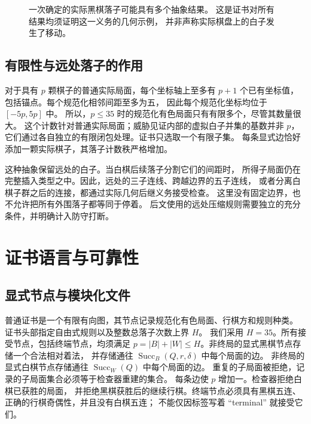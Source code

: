 \documentclass[11pt]{article}
\theoremstyle{definition}
\theoremstyle{remark}
\newcommand{\Succ}{\operatorname{Succ}}
\begin{document}
\begin{figure}[ht]
\centering
{}
\caption{一次确定的实际黑棋落子可能具有多个抽象结果。
这是证书对所有结果均须证明这一义务的几何示例，
并非声称实际棋盘上的白子发生了移动。}
\label{fig:black}
\end{figure}

\subsection{有限性与远处落子的作用}
对于具有 $p$ 颗棋子的普通实际局面，每个坐标轴上至多有
$p+1$ 个已有坐标值，包括锚点。每个规范化相邻间距至多为五，
因此每个规范化坐标均位于 $[-5p,5p]$ 中。
所以，$p\leq35$ 时的规范化有色局面只有有限多个，尽管其数量很大。
这个计数针对普通实际局面；威胁见证内部的虚拟白子并集的基数并非 $p$，
它们通过各自独立的有限闭包处理。证书只选取一个有限子集。
每条显式边恰好添加一颗实际棋子，其落子计数秩严格增加。

这种抽象保留远处的白子。当白棋后续落子分割它们的间距时，
所得子局面仍在完整插入类型之中。因此，远处的三子连线、跨越边界的五子连线，
或者分离白棋子群之后的连接，都通过实际几何后继义务接受检查。
这里没有固定边界，也不允许把所有外围落子都等同于停着。
后文使用的远处压缩规则需要独立的充分条件，并明确计入防守打断。

\section{证书语言与可靠性}
\label{sec:cert}
\subsection{显式节点与模块化文件}
普通证书是一个有限有向图，其节点记录规范化有色局面、行棋方和规则种类。
证书头部指定自由式规则以及整数总落子次数上界 $H$。
我们采用 $H=35$。所有接受节点，包括终端节点，均须满足 $p=|B|+|W|\le H$。非终局的显式黑棋节点存储一个合法相对着法，
并存储通往 $\Succ_B(Q,r,\delta)$ 中每个局面的边。
非终局的显式白棋节点存储通往 $\Succ_W(Q)$ 中每个局面的边。
重复的子局面被拒绝，记录的子局面集合必须等于检查器重建的集合。
每条边使 $p$ 增加一。检查器拒绝白棋已获胜的局面，
并拒绝黑棋获胜后的继续行棋。终端节点必须具有黑棋五连、
正确的行棋奇偶性，并且没有白棋五连；
不能仅因标签写着 ``terminal'' 就接受它们。
\end{document}
